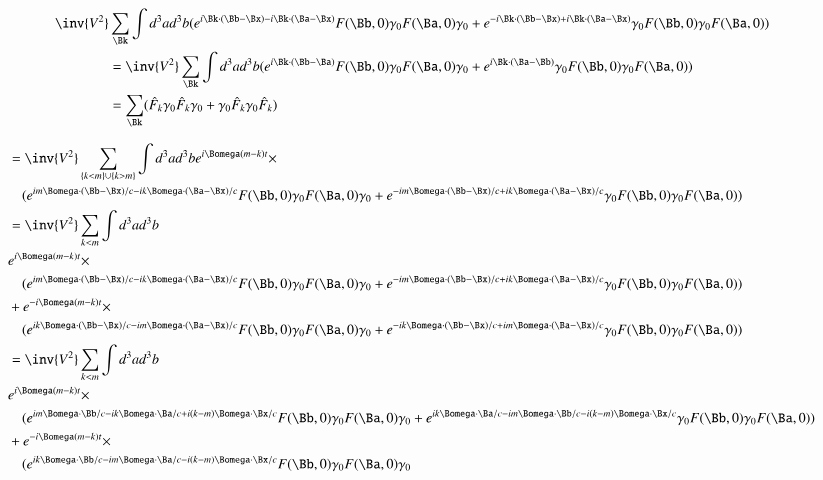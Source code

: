 \documentclass{article}
\begin{document}
\begin{align*}
\inv{V^2} &\sum_{\Bk} \int d^3 a d^3 b (e^{   i \Bk \cdot (\Bb-\Bx) - i \Bk \cdot (\Ba-\Bx) } F(\Bb, 0) \gamma_0 F(\Ba, 0) \gamma_0
+e^{ - i \Bk \cdot (\Bb-\Bx) + i \Bk \cdot (\Ba-\Bx) } \gamma_0 F(\Bb, 0) \gamma_0 F(\Ba, 0)) \\
&=
\inv{V^2} \sum_{\Bk} \int d^3 a d^3 b (e^{   i \Bk \cdot (\Bb - \Ba) } F(\Bb, 0) \gamma_0 F(\Ba, 0) \gamma_0
+e^{ i \Bk \cdot (\Ba -\Bb) } \gamma_0 F(\Bb, 0) \gamma_0 F(\Ba, 0)) \\
&=
\sum_{\Bk} ( \hat{F}_k \gamma_0 \hat{F}_k \gamma_0 + \gamma_0 \hat{F}_k \gamma_0 \hat{F}_k ) \\
\end{align*}


\begin{align*}
&=\inv{V^2} \sum_{\{k <m\} \cup \{ k > m \}} \int d^3 a d^3 b e^{i \Bomega (m -k) t } \times \\
&\quad (e^{   i m \Bomega \cdot (\Bb-\Bx)/c - i k \Bomega \cdot (\Ba-\Bx)/c } F(\Bb, 0) \gamma_0 F(\Ba, 0) \gamma_0
+e^{ - i m \Bomega \cdot (\Bb-\Bx)/c + i k \Bomega \cdot (\Ba-\Bx)/c } \gamma_0 F(\Bb, 0) \gamma_0 F(\Ba, 0)) \\
&=\inv{V^2} \sum_{ k <m } \int d^3 a d^3 b \\
&e^{i \Bomega (m -k) t } \times \\
&\quad (e^{   i m \Bomega \cdot (\Bb-\Bx)/c - i k \Bomega \cdot (\Ba-\Bx)/c } F(\Bb, 0) \gamma_0 F(\Ba, 0) \gamma_0
+e^{ - i m \Bomega \cdot (\Bb-\Bx)/c + i k \Bomega \cdot (\Ba-\Bx)/c } \gamma_0 F(\Bb, 0) \gamma_0 F(\Ba, 0)) \\
&+e^{-i \Bomega (m -k) t } \times \\
&\quad (e^{   i k \Bomega \cdot (\Bb-\Bx)/c - i m \Bomega \cdot (\Ba-\Bx)/c } F(\Bb, 0) \gamma_0 F(\Ba, 0) \gamma_0
+e^{ - i k \Bomega \cdot (\Bb-\Bx)/c + i m \Bomega \cdot (\Ba-\Bx)/c } \gamma_0 F(\Bb, 0) \gamma_0 F(\Ba, 0)) \\
&=\inv{V^2} \sum_{ k <m } \int d^3 a d^3 b \\
&e^{i \Bomega (m -k) t } \times \\
&\quad (e^{   i m \Bomega \cdot \Bb/c - i k \Bomega \cdot \Ba/c + i (k-m) \Bomega \cdot \Bx/c } F(\Bb, 0) \gamma_0 F(\Ba, 0) \gamma_0
+e^{ i k \Bomega \cdot \Ba/c - i m \Bomega \cdot \Bb/c - i (k -m) \Bomega \cdot \Bx/c } \gamma_0 F(\Bb, 0) \gamma_0 F(\Ba, 0)) \\
&+e^{-i \Bomega (m -k) t } \times \\
&\quad (e^{   i k \Bomega \cdot \Bb/c - i m \Bomega \cdot \Ba/c -i (k-m) \Bomega \cdot \Bx/c } F(\Bb, 0) \gamma_0 F(\Ba, 0) \gamma_0

\end{align*}
\end{document}
